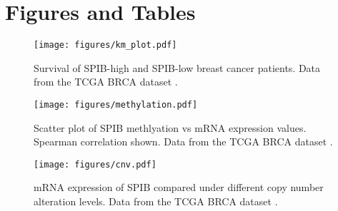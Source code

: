\section{Figures and Tables}

\begin{figure}[h!]
    \centering
    \texttt{[image: figures/km\_plot.pdf]}
    \caption{Survival of SPIB-high and SPIB-low breast cancer patients. Data from the TCGA BRCA dataset \cite{Ciriello2015, Goldman2018}.}
    \label{km_plot}
\end{figure} 

\begin{figure}[h!]
    \centering
    \texttt{[image: figures/methylation.pdf]}
    \caption{Scatter plot of SPIB methlyation vs mRNA expression values. Spearman correlation shown. Data from the TCGA BRCA dataset \cite{Ciriello2015, Goldman2018}.}
    \label{methylation}
\end{figure} 

\begin{figure}[h!]
    \centering
    \texttt{[image: figures/cnv.pdf]}
    \caption{mRNA expression of SPIB compared under different copy number alteration levels. Data from the TCGA BRCA dataset \cite{Ciriello2015, Goldman2018}.}
    \label{cnv}
\end{figure} 

